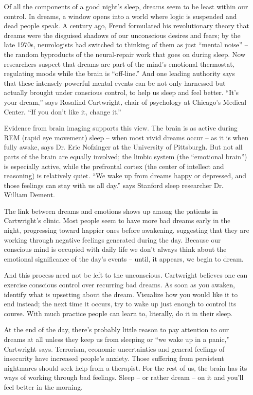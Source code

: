 Of all the components of a good night's sleep, dreams seem to be least within our control. In dreams, a window opens into a world where logic is suspended and dead people speak. A century ago, Freud formulated his revolutionary theory that dreams were the disguised shadows of our unconscious desires and fears; by the late 1970s, neurologists had switched to thinking of them as just ``mental noise'' – the random byproducts of the neural-repair work that goes on during sleep. Now researchers suspect that dreams are part of the mind's emotional thermostat, regulating moods while the brain is ``off-line.'' And one leading authority says that these intensely powerful mental events can be not only harnessed but actually brought under conscious control, to help us sleep and feel better. ``It's your dream,'' says Rosalind Cartwright, chair of psychology at Chicago's Medical Center. ``If you don't like it, change it.''


Evidence from brain imaging supports this view. The brain is as active during REM (rapid eye movement) sleep – when most vivid dreams occur – as it is when fully awake, says Dr. Eric Nofzinger at the University of Pittsburgh. But not all parts of the brain are equally involved; the limbic system (the ``emotional brain'') is especially active, while the prefrontal cortex (the center of intellect and reasoning) is relatively quiet. ``We wake up from dreams happy or depressed, and those feelings can stay with us all day.'' says Stanford sleep researcher Dr. William Dement.


The link between dreams and emotions shows up among the patients in Cartwright's clinic. Most people seem to have more bad dreams early in the night, progressing toward happier ones before awakening, suggesting that they are working through negative feelings generated during the day. Because our conscious mind is occupied with daily life we don't always think about the emotional significance of the day's events – until, it appears, we begin to dream.


And this process need not be left to the unconscious. Cartwright believes one can exercise conscious control over recurring bad dreams. As soon as you awaken, identify what is upsetting about the dream. Visualize how you would like it to end instead; the next time it occurs, try to wake up just enough to control its course. With much practice people can learn to, literally, do it in their sleep.


At the end of the day, there's probably little reason to pay attention to our dreams at all unless they keep us from sleeping or ``we wake up in a panic,'' Cartwright says. Terrorism, economic uncertainties and general feelings of insecurity have increased people's anxiety. Those suffering from persistent nightmares should seek help from a therapist. For the rest of us, the brain has its ways of working through bad feelings. Sleep – or rather dream – on it and you'll feel better in the morning.